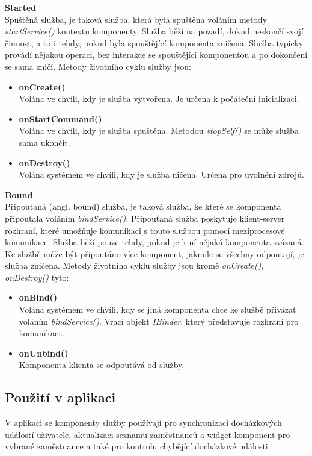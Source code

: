 \documentclass{diplomka}
\begin{document}
\begin{description}[]
\item \textbf{Started}\\
Spuštěná služba, je taková služba, která byla spuštěna voláním metody \emph{startService()} kontextu komponenty. Služba běží na pozadí, dokud neskončí svojí činnost, a to i tehdy, pokud byla spouštějící komponenta zničena. Služba typicky provádí nějakou operaci, bez interakce se spouštějící komponentou a po dokončení se sama zničí. Metody životního cyklu služby jsou: 
\begin{itemize}[]
\item \textbf{onCreate()}\\
Volána ve chvíli, kdy je služba vytvořena. Je určena k počáteční inicializaci.
\item \textbf{onStartCommand()}\\
Volána ve chvíli, kdy je služba spuštěna. Metodou \emph{stopSelf()} se může služba sama ukončit.
\item \textbf{onDestroy()}\\
Volána systémem ve chvíli, kdy je služba ničena. Určena pro uvolnění zdrojů.
\end{itemize}
\item \textbf{Bound}\\
Připoutaná (angl. bound) služba, je taková služba, ke které se komponenta připoutala voláním \emph{bindService()}. Připoutaná služba poskytuje klient-server rozhraní, které umožňuje komunikaci s touto službou pomocí meziprocesové komunikace. Služba běží pouze tehdy, pokud je k ní nějaká komponenta svázaná. Ke službě může být připoutáno více komponent, jakmile se všechny odpoutají, je služba zničena. Metody životního cyklu služby jsou kromě \emph{onCreate()}, \emph{onDestroy()} tyto:
\begin{itemize}[]
\item \textbf{onBind()}\\
Volána systémem ve chvíli, kdy se jiná komponenta chce ke službě přivázat voláním \emph{bindService()}. Vrací objekt \emph{IBinder}, který představuje rozhraní pro komunikaci.
\item \textbf{onUnbind()}\\
Komponenta klienta se odpoutává od služby.
\end{itemize}
\end{description}
\subsection*{Použití v aplikaci}
V aplikaci se komponenty služby používají pro synchronizaci docházkových událostí uživatele, aktualizaci seznamu zaměstnanců a widget komponent pro vybrané zaměstnance a také pro kontrolu chybějící docházkové události.
\end{document}

